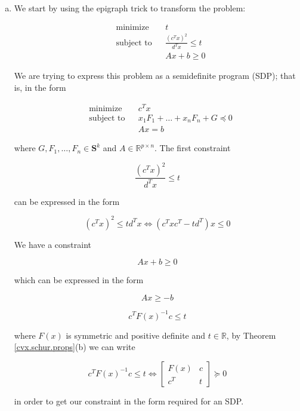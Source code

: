 \begin{enumerate}[(1)]
\begin{enumerate}[(a)]

%

%



\item We start by using the epigraph trick to transform the problem:

\[
\begin{aligned}
& {\text{minimize}}
& & t \\
& \text{subject to}
& & \frac{(c^Tx)^2}{d^Tx} \leq t \\
& & & Ax + b \geq 0
\end{aligned}
\]

We are trying to express this problem as a semidefinite program (SDP); that is, in the form

\[
\begin{aligned}
& {\text{minimize}}
& & c^T x \\
& \text{subject to}
& & x_1F_1 + \ldots + x_n F_n + G \preceq 0 \\
& & & Ax = b
\end{aligned}
\]

where \(G, F_1, \ldots, F_n \in \boldsymbol{S}^k\) and \(A \in \mathbb{R}^{p \times n}\). The first constraint

\[
\frac{(c^Tx)^2}{d^Tx} \leq t
\]

can be expressed in the form

\[
(c^Tx)^2 \leq t d^T x \iff (c^T x c^T - t d^T)x \leq 0
\]


We have a constraint

\[
Ax + b \geq 0
\]

which can be expressed in the form

\[
Ax \geq -b
\]

\[
c^TF(x)^{-1}c  \leq t
\]

where \(F(x)\) is symmetric and positive definite and \(t \in \mathbb{R}\), by Theorem \ref{cvx.schur.props}(b) we can write

\[
c^TF(x)^{-1}c  \leq t \iff  \begin{bmatrix}
    F(x)      & c \\
    c^T & t
\end{bmatrix} \succeq 0 
\]

in order to get our constraint in the form required for an SDP.


\end{enumerate}
\end{enumerate}
